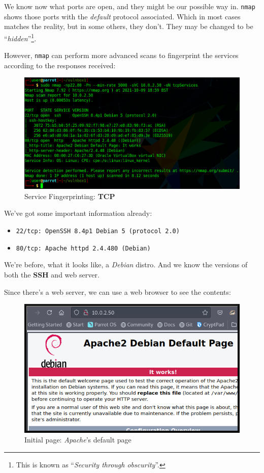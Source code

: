 \documentclass[12pt]{article}
\begin{document}
    We know now what ports are open, and they might be our possible way in.
    \texttt{nmap} shows those ports with the \textit{default} protocol
    associated. Which in most cases matches the reality, but in some others,
    they don't. They may be changed to be ``\textit{hidden}''\footnote{This is
    known as ``\textit{Security through obscurity}''.}.

    However, \texttt{nmap} can perform more advanced scans to fingerprint the
    services according to the responses received:

    \begin{figure}[H]\label{pic:03-nmap-tcpServices}
        \centering
        \includegraphics[width=1.00\textwidth]{03-nmap-tcpServices.png}
        \caption{Service Fingerprinting: \textbf{TCP}}
    \end{figure}

    We've got some important information already:
    \begin{itemize}
        \item \verb!22/tcp: OpenSSH 8.4p1 Debian 5 (protocol 2.0)!
        \item \verb!80/tcp: Apache httpd 2.4.480 (Debian)!
    \end{itemize}

    We're before, what it looks like, a \textit{Debian} distro. And we know the
    versions of both the \textbf{SSH} and web server.

    Since there's a web server, we can use a web browser to see the contents:

    \begin{figure}[H]\label{pic:04-browser}
        \centering
        \includegraphics[width=1.00\textwidth]{04-browser.png}
        \caption{Initial page: \textit{Apache}'s default page}
    \end{figure}
\end{document}
